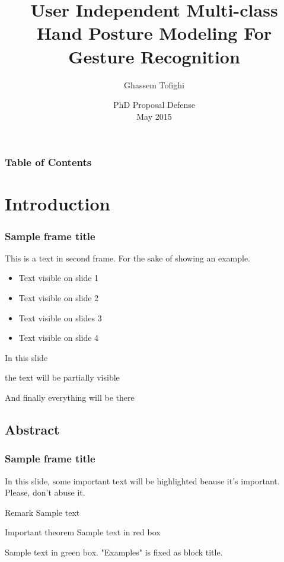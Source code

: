 \documentclass{beamer}
\title[\insertframenumber/\inserttotalframenumber] %
{User Independent Multi-class Hand Posture Modeling For Gesture Recognition}
\author[PhD Proposal] %
{Ghassem Tofighi}
\institute[VFU] %
{
Department of Electrical and Computer Engineering\\
Ryerosn University

}
\date[2015] %
{PhD Proposal Defense \\
	May 2015}
\begin{document}
\frame{\titlepage}


\begin{frame}
\frametitle{Table of Contents}
\tableofcontents
\end{frame}

\section{Introduction}

\begin{frame}
\frametitle{Sample frame title}
This is a text in second frame. For the sake of showing an example.

\begin{itemize}
    \item<1-> Text visible on slide 1
    \item<2-> Text visible on slide 2
    \item<3> Text visible on slides 3
    \item<4-> Text visible on slide 4
\end{itemize}
\end{frame}



\begin{frame}
In this slide \pause

the text will be partially visible \pause

And finally everything will be there
\end{frame}

\subsection{Abstract}

\begin{frame}
\frametitle{Sample frame title}

In this slide, some important text will be
\alert{highlighted} beause it's important.
Please, don't abuse it.

\begin{block}{Remark}
Sample text
\end{block}

\begin{alertblock}{Important theorem}
Sample text in red box
\end{alertblock}

\begin{examples}
Sample text in green box. "Examples" is fixed as block title.
\end{examples}
\end{frame}
\end{document}
